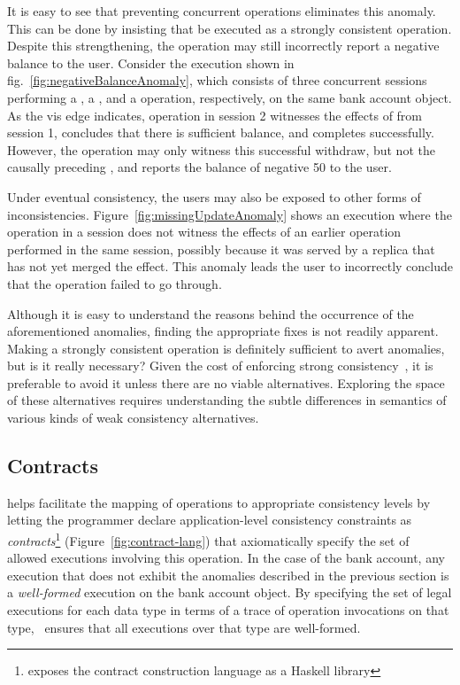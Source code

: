 It is easy to see that preventing concurrent  operations
eliminates this anomaly. This can be done by insisting that  be
executed as a strongly consistent operation. Despite this strengthening,
the  operation may still incorrectly report a negative balance to
the user. Consider the execution shown in
fig.~\ref{fig:negativeBalanceAnomaly}, which consists of three concurrent
sessions performing a , a , and a 
operation, respectively, on the same bank account object. As the {\sf vis} edge
indicates, operation  in session 2 witnesses the effects of
 from session 1, concludes that there is sufficient balance,
and completes successfully. However, the  operation may only
witness this successful withdraw, but not the causally preceding ,
and reports the balance of negative 50 to the user.

Under eventual consistency, the users may also be exposed to other forms of
inconsistencies. Figure~\ref{fig:missingUpdateAnomaly} shows an execution where
the  operation in a session does not witness the effects of an
earlier  operation performed in the same session, possibly because
it was served by a replica that has not yet merged the  effect.
This anomaly leads the user to incorrectly conclude that the 
operation failed to go through.

Although it is easy to understand the reasons behind the occurrence of the
aforementioned anomalies, finding the appropriate fixes is not readily
apparent. Making  a strongly consistent operation is definitely
sufficient to avert anomalies, but is it really necessary? Given the cost of
enforcing strong consistency~\cite{DynamoDB, Pileus}, it is preferable to avoid
it unless there are no viable alternatives. Exploring the space of these
alternatives requires understanding the subtle differences in semantics of
various kinds of weak consistency alternatives.

\subsection{Contracts}

\name helps facilitate the mapping of operations to appropriate consistency
levels by letting the programmer declare application-level consistency
constraints as \emph{contracts}\footnote{\name exposes the contract
construction language as a Haskell library} (Figure~\ref{fig:contract-lang})
that axiomatically specify the set of allowed executions involving this
operation. In the case of the bank account, any execution that does not exhibit
the anomalies described in the previous section is a \emph{well-formed}
execution on the bank account object. By specifying the set of legal executions
for each data type in terms of a trace of operation invocations on that type,
\name\ ensures that all executions over that type are well-formed.

